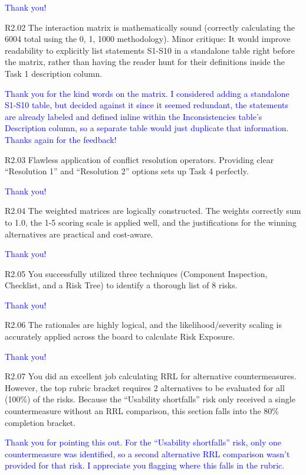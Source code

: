 \documentclass[10pt,letterpaper]{article}
\begin{document}
\textcolor{blue}{Thank you!}

R2.02 The interaction matrix is mathematically sound (correctly calculating the 6004 total using the 0, 1, 1000 methodology). Minor critique: It would improve readability to explicitly list statements S1-S10 in a standalone table right before the matrix, rather than having the reader hunt for their definitions inside the Task 1 description column.

\textcolor{blue}{Thank you for the kind words on the matrix. I considered adding a standalone S1-S10 table, but decided against it since it seemed redundant, the statements are already labeled and defined inline within the Inconsistencies table's Description column, so a separate table would just duplicate that information. Thanks again for the feedback!}

R2.03 Flawless application of conflict resolution operators. Providing clear ``Resolution 1'' and ``Resolution 2'' options sets up Task 4 perfectly.

\textcolor{blue}{Thank you!}

R2.04 The weighted matrices are logically constructed. The weights correctly sum to 1.0, the 1-5 scoring scale is applied well, and the justifications for the winning alternatives are practical and cost-aware.

\textcolor{blue}{Thank you!}

R2.05 You successfully utilized three techniques (Component Inspection, Checklist, and a Risk Tree) to identify a thorough list of 8 risks.

\textcolor{blue}{Thank you!}

R2.06 The rationales are highly logical, and the likelihood/severity scaling is accurately applied across the board to calculate Risk Exposure.

\textcolor{blue}{Thank you!}

R2.07 You did an excellent job calculating RRL for alternative countermeasures. However, the top rubric bracket requires 2 alternatives to be evaluated for all (100\%) of the risks. Because the ``Usability shortfalls'' risk only received a single countermeasure without an RRL comparison, this section falls into the 80\% completion bracket.

\textcolor{blue}{Thank you for pointing this out. For the ``Usability shortfalls'' risk, only one countermeasure was identified, so a second alternative RRL comparison wasn't provided for that risk. I appreciate you flagging where this falls in the rubric.}
\end{document}
